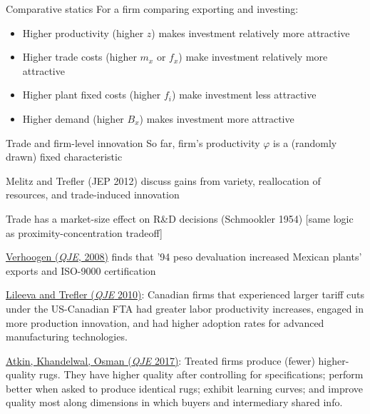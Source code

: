\documentclass[10pt,notes=hide]{beamer}
\begin{document}
\begin{frame}{Comparative statics}
\hypertarget{exportvsfdi}{}
For a firm comparing exporting and investing:
{
\begin{itemize}
  \item Higher productivity (higher $z$) makes investment relatively more attractive
  \item Higher trade costs (higher $m_x$ or $f_x$) make investment relatively more attractive %
  \item Higher plant fixed costs (higher $f_i$) make investment less attractive %
  \item Higher demand (higher $B_x$) makes investment more attractive %
\end{itemize}
}
\end{frame}
\begin{frame}{Trade and firm-level innovation}
{\small So far, firm's productivity $\varphi$ is a (randomly drawn) fixed characteristic}
\begin{itemize}
{\small 
\item Melitz and Trefler (JEP 2012) discuss gains from variety, reallocation of resources, and trade-induced innovation
\item Trade has a market-size effect on R\&D decisions (Schmookler 1954) [same logic as proximity-concentration tradeoff]
\item \href{https://academic.oup.com/qje/article-abstract/123/2/489/1930844}{Verhoogen (\textit{QJE}, 2008)} finds that '94 peso devaluation increased Mexican plants' exports and ISO-9000 certification
\item \href{http://qje.oxfordjournals.org.proxy.uchicago.edu/content/125/3/1051.short}{Lileeva and Trefler (\textit{QJE} 2010)}: Canadian firms that experienced larger tariff cuts under the US-Canadian FTA had greater labor productivity increases, engaged in more production innovation, and had higher adoption rates for advanced manufacturing technologies.
\item \href{https://academic.oup.com/qje/article/132/2/551/3002609}{Atkin, Khandelwal, Osman (\textit{QJE} 2017)}: Treated firms produce (fewer) higher-quality rugs. They have higher quality after controlling for specifications; perform better when asked to produce identical rugs; exhibit learning curves; and improve quality most along dimensions in which buyers and intermediary shared info.
}
\end{itemize}
\end{frame}
\end{document}
